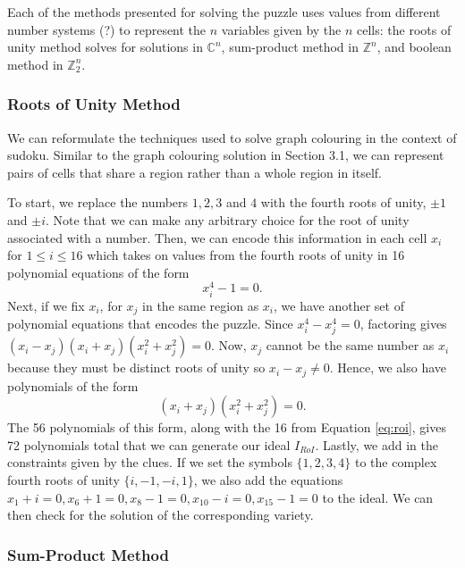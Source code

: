 \documentclass[../main.tex]{subfiles}
\begin{document}
            Each of the methods presented for solving the puzzle uses values from different number systems ({\color{red}?}) to represent the $n$ variables given by the $n$ cells: the roots of unity method solves for solutions in $\mathbb{C}^n$, sum-product method in $\mathbb{Z}^n$, and boolean method in $\mathbb{Z}_2^n$.

            \subsubsection{Roots of Unity Method}

            We can reformulate the techniques used to solve graph colouring in the context of sudoku. Similar to the graph colouring solution in Section 3.1, we can represent pairs of cells that share a region rather than a whole region in itself. 
            
            To start, we replace the numbers $1,2,3$ and $4$ with the fourth roots of unity, $\pm 1$ and $\pm i$. Note that we can make any arbitrary choice for the root of unity associated with a number. Then, we can encode this information in each cell $x_i$ for $1\leq i\leq 16$ which takes on values from the fourth roots of unity in 16 polynomial equations of the form
            \begin{equation} 
                \label{eq:roi}
                x_i^4-1=0.
            \end{equation}
            Next, if we fix $x_i$, for $x_j$ in the same region as $x_i$, we have another set of polynomial equations that encodes the puzzle. Since $x_i^4-x_j^4=0$, factoring gives $(x_i-x_j)(x_i+x_j)(x_i^2+x_j^2)=0$. Now, $x_j$ cannot be the same number as $x_i$ because they must be distinct roots of unity so $x_i-x_j\neq0$. Hence, we also have polynomials of the form
            \begin{equation}
                \label{eq:roi factor}
                (x_i+x_j)(x_i^2+x_j^2)=0.
            \end{equation}
            The 56 polynomials of this form, along with the 16 from Equation \ref{eq:roi}, gives 72 polynomials total that we can generate our ideal $I_{RoI}$. Lastly, we add in the constraints given by the clues. If we set the symbols $\{1,2,3,4\}$ to the complex fourth roots of unity $\{i,-1,-i,1\}$, we also add the equations $x_1+i=0, x_6+1=0, x_8-1=0, x_{10} -i = 0, x_{15}-1=0$ to the ideal. We can then check for the solution of the corresponding variety.

            \subsubsection{Sum-Product Method} \label{sec:sumproduct}
\end{document}
